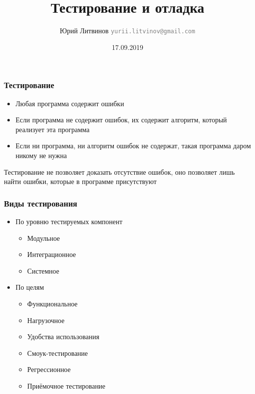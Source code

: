 \documentclass[xetex,mathserif,serif]{beamer}
\title{Тестирование и отладка}
\author[Юрий Литвинов]{Юрий Литвинов \newline \textcolor{gray}{\small\texttt{yurii.litvinov@gmail.com}}}
\date{17.09.2019}
\begin{document}
	
	\frame{\titlepage}
	
	\begin{frame}
		\frametitle{Тестирование}
		\begin{itemize}
			\item Любая программа содержит ошибки                                                    
			\item Если программа не содержит ошибок, их содержит алгоритм, который реализует эта программа
			\item Если ни программа, ни алгоритм ошибок не содержат, такая программа даром никому не нужна
		\end{itemize}
		\vspace{1cm}
		Тестирование не позволяет доказать отсутствие ошибок, оно позволяет лишь найти ошибки, которые в программе присутствуют
	\end{frame}

	\begin{frame}
		\frametitle{Виды тестирования}
		\begin{itemize}
			\item По уровню тестируемых компонент
			\begin{itemize}
				\item Модульное
				\item Интеграционное
				\item Системное
			\end{itemize}
			\item По целям
			\begin{itemize}
				\item Функциональное
				\item Нагрузочное
				\item Удобства использования
				\item Смоук-тестирование
				\item Регрессионное
				\item Приёмочное тестирование
			\end{itemize}
		\end{itemize}
	\end{frame}
                
\end{document}
